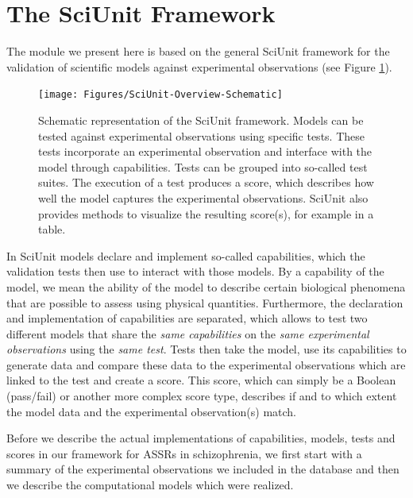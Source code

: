 \documentclass[a4paper,10pt]{article}
\begin{document}

\section{The SciUnit Framework}
The module we present here is based on the general SciUnit framework for the validation of scientific models against 
experimental observations \cite{Omar2014} (see Figure \ref{Fig:SciUnit-Scheme}).

\begin{figure}
\texttt{[image: Figures/SciUnit-Overview-Schematic]}
\caption{Schematic representation of the SciUnit framework. Models can be tested against experimental observations using specific tests. 
These tests incorporate an experimental observation and interface with the model through capabilities. Tests can be grouped into so-called test suites. The execution of a test 
produces a score, which describes how well the model captures the experimental observations. SciUnit also provides methods to visualize the resulting score(s), for example in a table.}
\label{Fig:SciUnit-Scheme}
\end{figure}

In SciUnit models declare and implement so-called capabilities, which the validation tests then use to 
interact with those models. By a capability of the model, we mean the ability of the model to describe certain biological phenomena that are possible to assess using physical quantities.
Furthermore, the declaration
and implementation of capabilities are separated, which allows to test two different models that share the 
\textit{same capabilities} on the \textit{same experimental observations} using
the \textit{same test}. Tests then take the model, use its capabilities to generate data and compare these data to the 
experimental observations which are linked to the test
and create a score. This score, which can simply be a Boolean (pass/fail) or another more complex score type, 
describes if and to which extent the model data and the experimental observation(s) match.

Before we describe the actual implementations of capabilities, models, tests and scores in our framework for 
ASSRs in schizophrenia,
we first start with a summary of the experimental observations we included in the database and 
then we describe the computational models which were realized.
\end{document}

